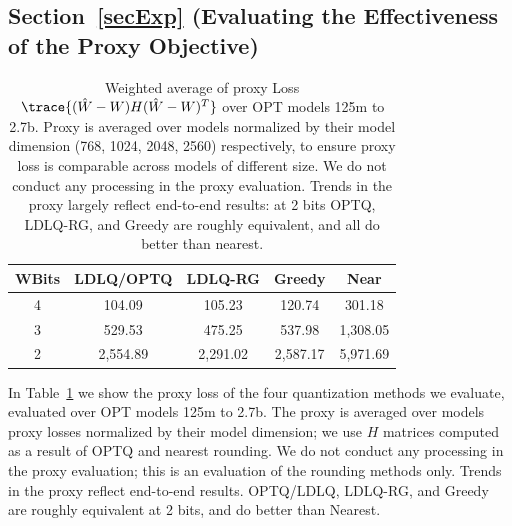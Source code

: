







\newpage
\newpage
\newpage
\newpage


\subsection{Section~\ref{secExp} (Evaluating the Effectiveness of the Proxy Objective)}
\begin{table}[h!]
\centering
\begin{tabular}{c|cccc}
WBits\Bstrut & LDLQ/OPTQ & LDLQ-RG & Greedy & Near \\
\hline
4\Tstrut &
104.09 &
105.23 &
120.74 &
301.18
\\
3 &
529.53 &
475.25 &
537.98 &
1,308.05
\\
2 &
2,554.89 &
2,291.02 &
2,587.17 &
5,971.69
\\
\end{tabular}
\caption{
Weighted average of proxy Loss $\trace{ (\hat W - W) H (\hat W - W)^T }$ over OPT models 125m to 2.7b.
Proxy is averaged over models normalized by their model dimension (768, 1024, 2048, 2560) respectively, to ensure proxy loss is comparable across models of different size.
We do not conduct any processing in the proxy evaluation.
Trends in the proxy largely reflect end-to-end results: at 2 bits OPTQ, LDLQ-RG, and Greedy are roughly equivalent, and all do better than nearest.
}
\label{tabSuppProxy}
\end{table}
In Table~\ref{tabSuppProxy} we show the proxy loss of the four quantization methods we evaluate, evaluated over OPT models 125m to 2.7b.
The proxy is averaged over models proxy losses normalized by their model dimension; we use $H$ matrices computed as a result of OPTQ and nearest rounding.
We do not conduct any processing in the proxy evaluation; this is an evaluation of the rounding methods only.
Trends in the proxy reflect end-to-end results. 
OPTQ/LDLQ, LDLQ-RG, and Greedy are roughly equivalent at 2 bits, and do better than Nearest.


